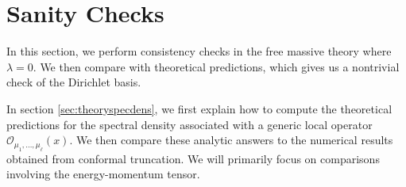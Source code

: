 


\section{Sanity Checks}
\label{sec:SanityChecks}

In this section, we perform consistency checks in the free massive theory where 
$\lambda = 0$. We then compare with theoretical predictions, which gives us a 
nontrivial check of the Dirichlet basis.

In section \ref{sec:theoryspecdens}, we first explain how to compute the 
theoretical predictions for the spectral density associated with a generic local 
operator $\mathcal{O}_{\mu_1, \dots, \mu_{\ell}}(x)$. We then compare these 
analytic answers to the numerical results obtained from conformal truncation. 
We will primarily focus on comparisons involving the energy-momentum tensor.





